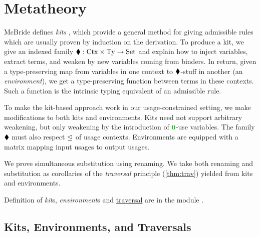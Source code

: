 \documentclass[submission,copyright,creativecommons]{eptcs}
\begin{document}

\section{Metatheory}\label{sec:metatheory}

McBride defines \emph{kits} \cite{rensub05,bhkm12}, which provide a general
method for giving admissible rules which are usually proven by induction on the
derivation.
To produce a kit, we give an indexed family
$\mathbin{\blacklozenge} : \mathrm{Ctx} \times \mathrm{Ty} \to \mathrm{Set}$ and explain how to
inject variables, extract terms, and weaken by new variables coming from
binders.
In return, given a type-preserving map from variables in one context to
$\mathbin{\blacklozenge}$-stuff in another (an \emph{environment}), we get a type-preserving
function between terms in these contexts.
Such a function is the intrinsic typing equivalent of an admissible rule.

To make the kit-based approach work in our usage-constrained setting, we make
modifications to both kits and environments.
Kits need not support arbitrary weakening, but only weakening by the
introduction of $\rescomment 0$-use variables.
The family $\mathbin{\blacklozenge}$ must also respect $\trianglelefteq$ of usage contexts.
Environments are equipped with a matrix mapping input usages to output usages.

We prove simultaneous substitution using renaming.
We take both renaming and substitution as corollaries of the \emph{traversal}
principle (\autoref{thm:trav}) yielded from kits and environments.

Definition of \emph{kit}s, \emph{environment}s and
\hyperref[thm:trav]{traversal} are in the module
.


\subsection{Kits, Environments, and Traversals}
\end{document}
